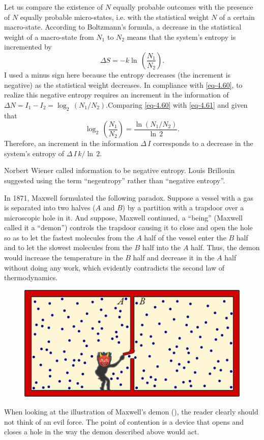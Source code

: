 Let us compare the existence of $N$ equally probable outcomes with the presence of $N$ equally probable micro-states, i.e. with the statistical weight $N$ of a certain macro-state. According to Boltzmann's formula, a decrease in the statistical weight of a macro-state from $N_{1}$ to $ N_{2}$ means that the system's entropy is incremented by
\begin{equation}%
\Delta S = - k  \ln \, \left( \frac{N_{1}}{N_{2}} \right).
\label{eq-4.61}
\end{equation}
I used a minus sign here because the entropy decreases (the increment is negative) as the statistical weight decreases. In compliance with \eqref{eq-4.60}, to realize this negative entropy requires an increment in the information of $\Delta N = I_{1}- I_{2} = \log_{2} \, \left( N_{1}/ N_{2} \right)
$.Comparing \eqref{eq-4.60} with \eqref{eq-4.61} and given that
\begin{equation*}
\log_{2} \, \left( \frac{N_{1}}{N_{2}} \right) = \frac{\ln \left( N_{1}/ N_{2} \right) }{\ln \, 2}.
\end{equation*}
Therefore, an increment in the information $\Delta \, I$ corresponds to a decrease in the system's entropy of $\Delta \, I \, k / \ln \, 2$.

Norbert Wiener called information to be negative entropy. Louis Brillouin suggested using the term ``negentropy'' rather than ``negative entropy''.

 In 1871, Maxwell formulated the following paradox. Suppose a vessel with a gas is separated into two halves ($A$ and $B$) by a partition with a trapdoor over a microscopic hole in it. And suppose, Maxwell continued, a ``being'' (Maxwell called it a ``demon'') controls the trapdoor causing it to close and open the hole so as to let the fastest molecules from the $A$ half of the vessel enter the $B$ half and to let the slowest molecules from the $B$ half into the $A$ half. Thus, the demon would increase the temperature in the $B$ half and decrease it in the $A$ half without doing any work, which evidently contradicts the second law of thermodynamics.
\begin{figure}[!ht]
 \centering
 \includegraphics[width=0.9\linewidth]{figures/maxwell-demon.pdf}
 \end{figure}
When looking at the illustration of Maxwell's demon (), the reader clearly should not think of an evil force. The point of contention is a device that opens and closes a hole in the way the demon described above would act.

